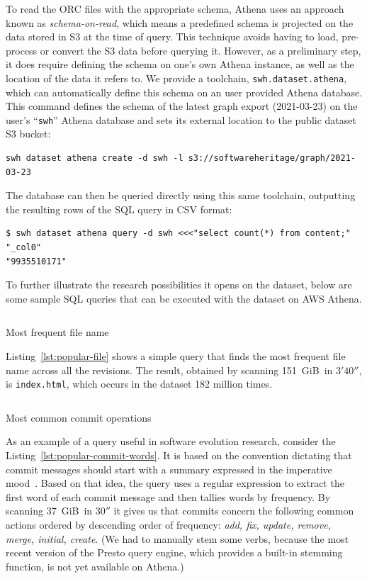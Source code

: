 To read the ORC files with the appropriate schema, Athena uses an approach
known as \emph{schema-on-read}, which means a predefined schema is projected on
the data stored in S3 at the time of query. This technique avoids having to
load, pre-process or convert the S3 data before querying it. However, as a
preliminary step, it does require defining the schema on one's own Athena
instance, as well as the location of the data it refers to. We provide a
toolchain, \texttt{swh.dataset.athena}, which can automatically define this
schema on an user provided Athena database. This command defines the schema of
the latest graph export (2021-03-23) on the user's ``\texttt{swh}'' Athena
database and sets its external location to the public dataset S3 bucket:

\begin{verbatim}
swh dataset athena create -d swh -l s3://softwareheritage/graph/2021-03-23
\end{verbatim}

The database can then be queried directly using this same toolchain, outputting
the resulting rows of the SQL query in CSV format:

\begin{verbatim}
$ swh dataset athena query -d swh <<<"select count(*) from content;"
"_col0"
"9935510171"
\end{verbatim}

To further illustrate the research possibilities it opens on the dataset, below
are some sample SQL queries that can be executed with the dataset on
\textsc{AWS} Athena.

\begin{listing}[H]
    \inputminted[firstline=4]{sql}{codesamples/graph-dataset/popular-file.sql}
    \caption{Most frequent file name}%
    \label{lst:popular-file}
\end{listing}

Listing~\ref{lst:popular-file} shows a simple query
that finds the most frequent file name across all the revisions.
The result, obtained by scanning
151~GiB\ in $3'40''$, is \texttt{index.html}, which occurs in the dataset 182
million times.

\begin{listing}[H]
    \inputminted[firstline=3]{sql}{codesamples/graph-dataset/popular-commit-words.sql}
    \caption{Most common commit operations}%
    \label{lst:popular-commit-words}
\end{listing}

As an example of a query useful in software evolution research,
consider the Listing~\ref{lst:popular-commit-words}.
It is based on the convention dictating that commit messages should
start with a summary expressed in the imperative mood~\cite[3.3.2.1]{Fre19}.
Based on that idea, the query uses a regular expression to extract the first
word of each commit message and then tallies words by frequency.
By scanning 37~GiB\ in $30''$ it gives us that commits
concern the following common actions ordered by descending order of frequency:
\emph{add, fix, update, remove, merge, initial, create}.
(We had to manually stem some verbs,
because the most recent version of the Presto query engine,
which provides a built-in stemming function,
is not yet available on Athena.)

